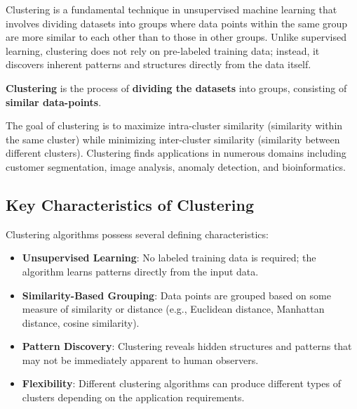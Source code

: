\documentclass{article}
\begin{document}
Clustering is a fundamental technique in unsupervised machine learning that involves dividing datasets into groups where data points within the same group are more similar to each other than to those in other groups. Unlike supervised learning, clustering does not rely on pre-labeled training data; instead, it discovers inherent patterns and structures directly from the data itself.

\begin{tcolorbox}[title=Definition of Clustering]
\centering
\large
\textbf{Clustering} is the process of \textbf{dividing the datasets} into groups, consisting of \textbf{similar data-points}.
\end{tcolorbox}

The goal of clustering is to maximize intra-cluster similarity (similarity within the same cluster) while minimizing inter-cluster similarity (similarity between different clusters). Clustering finds applications in numerous domains including customer segmentation, image analysis, anomaly detection, and bioinformatics.

\subsection{Key Characteristics of Clustering}

Clustering algorithms possess several defining characteristics:

\begin{itemize}
    \item \textbf{Unsupervised Learning}: No labeled training data is required; the algorithm learns patterns directly from the input data.
    
    \item \textbf{Similarity-Based Grouping}: Data points are grouped based on some measure of similarity or distance (e.g., Euclidean distance, Manhattan distance, cosine similarity).
    
    \item \textbf{Pattern Discovery}: Clustering reveals hidden structures and patterns that may not be immediately apparent to human observers.
    
    \item \textbf{Flexibility}: Different clustering algorithms can produce different types of clusters depending on the application requirements.
\end{itemize}
\end{document}
